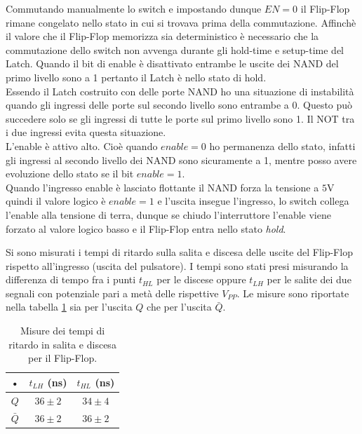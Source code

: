 \documentclass[10pt,a4paper]{article}
\begin{document}
Commutando manualmente lo switch e impostando dunque $EN = 0$ il Flip-Flop rimane congelato nello stato in cui si trovava prima della commutazione.
Affinchè il valore che il Flip-Flop memorizza sia deterministico è necessario che la commutazione dello switch non avvenga durante gli hold-time e setup-time del Latch. Quando il bit di enable è disattivato entrambe le uscite dei NAND del primo livello sono a 1 pertanto il Latch è nello stato di hold.\\

Essendo il Latch costruito con delle porte NAND ho una situazione di instabilità quando gli ingressi delle porte sul secondo livello sono entrambe a 0. Questo può succedere solo se gli ingressi di tutte le porte sul primo livello sono 1. Il NOT tra i due ingressi evita questa situazione.\\
L'enable è attivo alto. Cioè quando $enable = 0$ ho permanenza dello stato, infatti gli ingressi al secondo livello dei NAND sono sicuramente a 1, mentre posso avere evoluzione dello stato se il bit $enable = 1$.\\
Quando l'ingresso enable è lasciato flottante il NAND forza la tensione a $5$V quindi il valore logico è   $enable = 1$ e l'uscita insegue l'ingresso, lo switch collega l'enable alla tensione di terra, dunque se chiudo l'interruttore l'enable viene forzato al valore logico basso e il Flip-Flop entra nello stato \emph{hold}.%

Si sono misurati i tempi di ritardo sulla salita e discesa delle uscite del Flip-Flop rispetto all'ingresso (uscita del pulsatore). I tempi sono stati presi misurando la differenza di tempo fra i punti $t_{HL}$ per le discese oppure $t_{LH}$ per le salite dei due segnali con potenziale pari a metà delle rispettive $V_{PP}$. Le misure sono riportate nella tabella \ref{ritardo} sia per l'uscita $Q$ che per l'uscita $\bar{Q}$.

\begin{table}[!htb]
\centering
\begin{tabular}{|c|c|c|}
\hline 
• & $t_{LH}$ (ns) & $t_{HL}$ (ns)\\
\hline
$Q$ & $36 \pm 2$ & $34 \pm 4$\\
\hline
$\bar{Q}$ & $36 \pm 2$ & $36 \pm 2$\\
\hline
\end{tabular}
\caption{Misure dei tempi di ritardo in salita e discesa per il Flip-Flop.\label{ritardo}}
\end{table}
\end{document}
